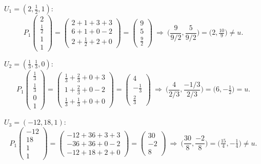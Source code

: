 \documentclass[11pt,a4paper]{article}
\begin{document}
\noindent$U_1=(2,\tfrac12,1)$:
\begin{equation}
  P_1\begin{pmatrix}2\\ \tfrac12\\1\\1\end{pmatrix}
  =\begin{pmatrix}2+1+3+3\\ 6+1+0-2\\ 2+\tfrac12+2+0\end{pmatrix}
  =\begin{pmatrix}9\\5\\ \tfrac92\end{pmatrix}
  \ \Rightarrow\ \Big(\frac{9}{9/2},\frac{5}{9/2}\Big)=\Big(2,\tfrac{10}{9}\Big)\neq u.
\end{equation}

\noindent$U_2=(\tfrac13,\tfrac13,0)$:
\begin{equation}
  P_1\begin{pmatrix}\tfrac13\\ \tfrac13\\0\\1\end{pmatrix}
  =\begin{pmatrix}\tfrac13+\tfrac23+0+3\\ 1+\tfrac23+0-2\\ \tfrac13+\tfrac13+0+0\end{pmatrix}
  =\begin{pmatrix}4\\-\tfrac13\\ \tfrac23\end{pmatrix}
  \ \Rightarrow\ \Big(\frac{4}{2/3},\frac{-1/3}{2/3}\Big)=\Big(6,-\tfrac12\Big)=u.
\end{equation}

\noindent$U_3=(-12,18,1)$:
\begin{equation}
  P_1\begin{pmatrix}-12\\18\\1\\1\end{pmatrix}
  =\begin{pmatrix}-12+36+3+3\\ -36+36+0-2\\ -12+18+2+0\end{pmatrix}
  =\begin{pmatrix}30\\-2\\8\end{pmatrix}
  \ \Rightarrow\ \Big(\frac{30}{8},\frac{-2}{8}\Big)=\Big(\tfrac{15}{4},-\tfrac14\Big)\neq u.
\end{equation}
\end{document}
